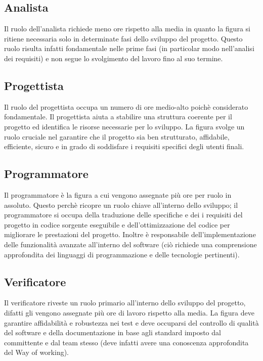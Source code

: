 \documentclass{article}
\begin{document}
\subsection{Analista}
Il ruolo dell'analista richiede meno ore rispetto alla media in quanto la figura si ritiene necessaria solo in determinate fasi dello sviluppo del progetto. Questo ruolo risulta infatti fondamentale nelle prime fasi (in particolar modo nell'analisi dei requisiti) e non segue lo svolgimento del lavoro fino al suo termine. 

\subsection{Progettista}
Il ruolo del progettista occupa un numero di ore medio-alto poichè considerato fondamentale. Il progettista aiuta a stabilire una struttura coerente per il progetto 
ed identifica le risorse necessarie per lo sviluppo. 
La figura svolge un ruolo cruciale nel garantire che il progetto sia ben strutturato, affidabile, efficiente, sicuro e in grado di soddisfare i requisiti specifici degli utenti finali.

\subsection{Programmatore}
Il programmatore è la figura a cui vengono assegnate più ore per ruolo in assoluto. Questo perchè ricopre un ruolo chiave all'interno dello sviluppo; il programmatore si occupa della traduzione delle specifiche e dei i requisiti del progetto in codice sorgente eseguibile e dell'ottimizzazione del codice per migliorare le prestazioni del progetto. Inoltre è responsabile dell'implementazione delle funzionalità avanzate all'interno del software (ciò richiede una comprensione approfondita dei linguaggi di programmazione e delle tecnologie pertinenti).

\subsection{Verificatore}
Il verificatore riveste un ruolo primario all'interno dello sviluppo del progetto, difatti gli vengono assegnate più ore di lavoro rispetto alla media. La figura deve garantire affidabilità e robustezza nei test e deve occuparsi del controllo di qualità del software e della documentazione in base agli standard imposto dal committente e dal team stesso (deve infatti avere una conoscenza approfondita del Way of working).
\end{document}
